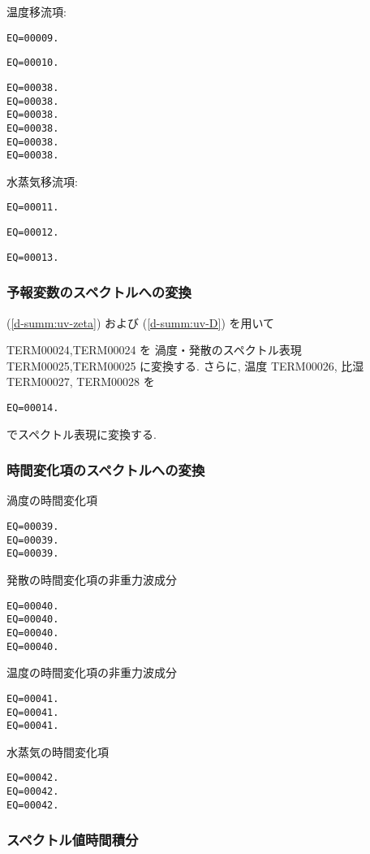 温度移流項:
\begin{verbatim}
EQ=00009.
\end{verbatim}
\begin{verbatim}
EQ=00010.
\end{verbatim}
%
\begin{verbatim}
EQ=00038.
EQ=00038.
EQ=00038.
EQ=00038.
EQ=00038.
EQ=00038.
\end{verbatim}

水蒸気移流項:
\begin{verbatim}
EQ=00011.
\end{verbatim}
\begin{verbatim}
EQ=00012.
\end{verbatim}
%
\begin{verbatim}
EQ=00013.
\end{verbatim}

\subsubsection{予報変数のスペクトルへの変換}

(\ref{d-summ:uv-zeta}) および
(\ref{d-summ:uv-D}) を用いて

TERM00024,TERM00024 を
渦度・発散のスペクトル表現
TERM00025,TERM00025 に変換する.
さらに,
温度 TERM00026, 比湿 TERM00027, 
TERM00028 を
\begin{verbatim}
EQ=00014.
\end{verbatim}
でスペクトル表現に変換する.

\subsubsection{時間変化項のスペクトルへの変換}

渦度の時間変化項
\begin{verbatim}
EQ=00039.
EQ=00039.
EQ=00039.
\end{verbatim}
%
発散の時間変化項の非重力波成分
\begin{verbatim}
EQ=00040.
EQ=00040.
EQ=00040.
EQ=00040.
\end{verbatim}
%
温度の時間変化項の非重力波成分
\begin{verbatim}
EQ=00041.
EQ=00041.
EQ=00041.
\end{verbatim}
%
水蒸気の時間変化項
\begin{verbatim}
EQ=00042.
EQ=00042.
EQ=00042.
\end{verbatim}

\subsubsection{スペクトル値時間積分}

